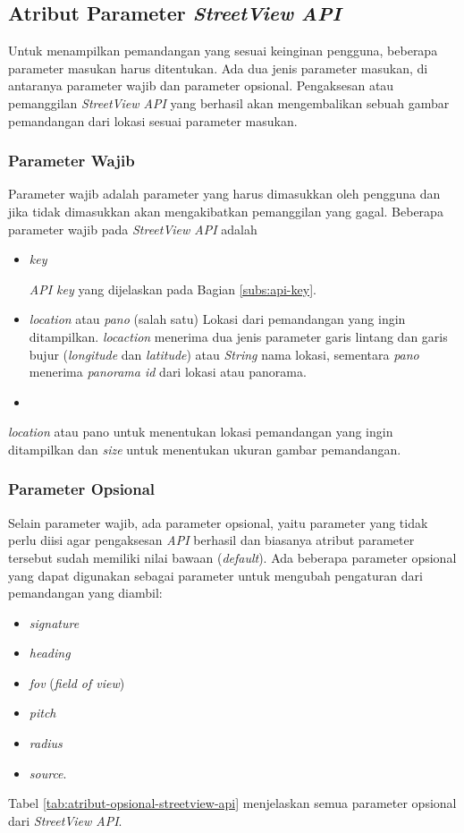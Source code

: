 \subsection{Atribut Parameter {\it StreetView API}}
\label{subs:parameter}
Untuk menampilkan pemandangan yang sesuai keinginan pengguna, beberapa parameter masukan harus ditentukan. Ada dua jenis parameter masukan, di antaranya parameter wajib dan parameter opsional. Pengaksesan atau pemanggilan {\it StreetView API} yang berhasil akan mengembalikan sebuah gambar pemandangan dari lokasi sesuai parameter masukan. 

\subsubsection{Parameter Wajib}
Parameter wajib adalah parameter yang harus dimasukkan oleh pengguna dan jika tidak dimasukkan akan mengakibatkan pemanggilan yang gagal. 
Beberapa parameter wajib pada {\it StreetView API} adalah
\begin{itemize}
	\item \textit{key}
	
	\textit{API key} yang dijelaskan pada Bagian \ref{subs:api-key}.
	\item \textit{location} atau \textit{pano} (salah satu)
	 Lokasi dari pemandangan yang ingin ditampilkan. \textit{locaction} menerima dua jenis parameter garis lintang dan garis bujur (\textit{longitude} dan \textit{latitude}) atau \textit{String} nama lokasi, sementara \textit{pano} menerima \textit{panorama id} dari lokasi atau panorama. 
	 \item 
\end{itemize}
{\it location} atau pano untuk menentukan lokasi pemandangan yang ingin ditampilkan dan {\it size} untuk menentukan ukuran gambar pemandangan.    

\subsubsection{Parameter Opsional}
Selain parameter wajib, ada parameter opsional, yaitu parameter yang tidak perlu diisi agar pengaksesan {\it API} berhasil dan biasanya atribut parameter tersebut sudah memiliki nilai bawaan ({\it default}). Ada beberapa parameter opsional yang dapat digunakan sebagai parameter untuk mengubah pengaturan dari pemandangan yang diambil:
\begin{itemize}
	\item {\it signature}
	\item {\it heading}
	\item {\it fov} ({\it field of view})
	\item {\it pitch}
	\item {\it radius}
	\item {\it source}.
\end{itemize}
Tabel \ref{tab:atribut-opsional-streetview-api} menjelaskan semua parameter opsional dari \textit{StreetView API}.

